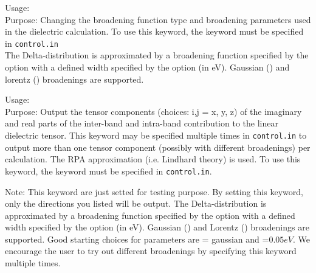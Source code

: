 {
   \noindent 
   Usage:    \\[1.0ex]
   
   Purpose: Changing the broadening function type and broadening parameters used in the dielectric calculation. To use this keyword, the  keyword must be specified in \texttt{control.in} \\
   The Delta-distribution is approximated by a broadening function specified by the  option with a defined width specified by the  option (in eV). Gaussian () and lorentz () broadenings are supported.   
}

{
   \noindent
   Usage:     \\[1.0ex]

   Purpose: Output the  tensor components (choices: i,j = x, y, z) of the imaginary and real parts of the inter-band and intra-band contribution to the linear dielectric tensor.  This keyword may be specified multiple times in \texttt{control.in} to output more than one tensor component (possibly with different broadenings) per calculation.  The RPA approximation (i.e. Lindhard theory) is used.  To use this keyword, the  keyword must be specified in \texttt{control.in}.
   
   Note: This keyword are just setted for testing purpose. By setting this keyword, only the directions you listed will be output. 
   The Delta-distribution is approximated by a broadening function specified by the  option with a defined width specified by the  option (in eV).   Gaussian () and Lorentz () broadenings are supported.  Good starting choices for parameters are  = gaussian and =$0.05eV$.  We encourage the user to try out different broadenings by specifying this keyword multiple times. \\[1.0ex]
}   
